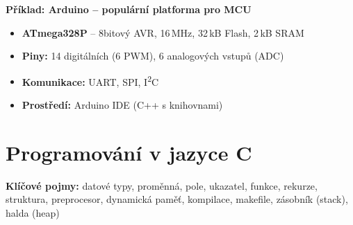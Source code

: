 \documentclass[a4paper,10pt]{article}
\begin{document}
\begin{vysvetlenibox}
\textbf{Příklad: Arduino -- populární platforma pro MCU}
\begin{itemize}[noitemsep, leftmargin=1.4em, topsep=4pt]
    \item \textbf{ATmega328P} -- 8bitový AVR, 16\,MHz, 32\,kB Flash, 2\,kB SRAM
    \item \textbf{Piny:} 14 digitálních (6 PWM), 6 analogových vstupů (ADC)
    \item \textbf{Komunikace:} UART, SPI, I\textsuperscript{2}C
    \item \textbf{Prostředí:} Arduino IDE (C++ s knihovnami)
\end{itemize}
\end{vysvetlenibox}

\section{Programování v jazyce C}

\begin{pojmybox}
\textbf{Klíčové pojmy:}
datové typy, proměnná, pole, ukazatel, funkce, rekurze,
struktura, preprocesor, dynamická paměť, kompilace, makefile,
zásobník (stack), halda (heap)
\end{pojmybox}
\end{document}
